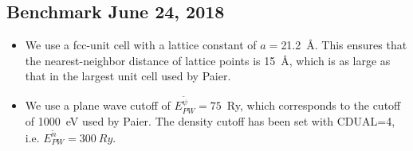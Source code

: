 \documentclass{book}
\begin{document}
\subsection*{Benchmark June 24, 2018}
\begin{itemize}
\item We use a fcc-unit cell with a lattice constant of $a=$21.2~{\AA}. This
ensures that the nearest-neighbor distance of lattice points is
15~\AA, which is as large as that in the largest unit cell used by
Paier\cite{paier05_jcp122_234102}.
%
\item We use a plane wave cutoff of $E_{PW}^{\tilde{\psi}}=75$~Ry, which
corresponds to the cutoff of 1000~eV used by
Paier\cite{paier05_jcp122_234102}.
The density cutoff has been set with CDUAL=4,
i.e. $E_{PW}^{\tilde{n}}=300~Ry$.


\end{itemize}
\end{document}
